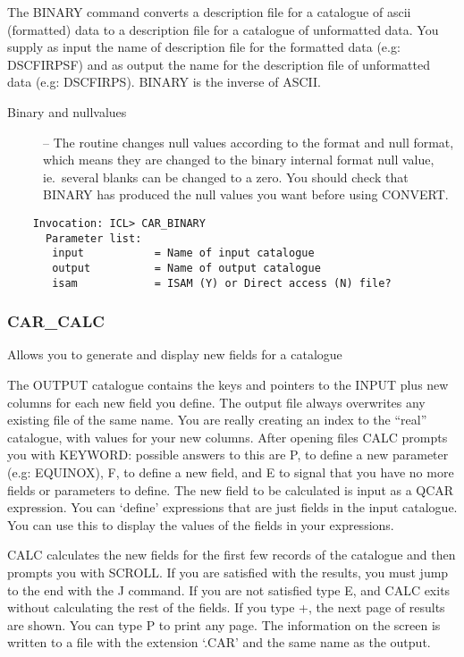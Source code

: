 The BINARY command converts a description file for a catalogue of ascii
(formatted) data to a description file for a catalogue of unformatted data. 
You supply as input the name of description file
for the formatted data (e.g: DSCFIRPSF) and as output the name for
the description file of unformatted data (e.g: DSCFIRPS).
BINARY is the inverse of ASCII.

\begin{description}
\item [Binary and nullvalues] --
The routine changes null values according to the format and null format,
which means they are changed to the binary internal format null value,
ie.\ several blanks can be changed to a zero.
You should check that BINARY has produced the null values you want before using
CONVERT.
\end{description}

\begin{verbatim}
    Invocation: ICL> CAR_BINARY
      Parameter list:
       input           = Name of input catalogue
       output          = Name of output catalogue
       isam            = ISAM (Y) or Direct access (N) file?
\end{verbatim}
 
\subsubsection{CAR\_CALC}

Allows you to generate and display new fields for a catalogue

The OUTPUT catalogue contains the keys and pointers to the INPUT
plus new columns for each new field you define. 
The output file always overwrites any existing file of the same name.
You are really creating an index to the ``real'' catalogue, with values for
your new columns.
After opening files CALC prompts you with KEYWORD:
possible answers to this are P, to define a new parameter (e.g: EQUINOX),
F, to define a new field, and E to signal that you have no more fields
or parameters to define.
The new field to be calculated is input as a QCAR expression.
You can `define' expressions that are just fields in the input catalogue.
You can use this to display the values of the fields in your expressions.

CALC calculates the new fields for the first few records
of the catalogue and then prompts you with SCROLL.  
If you are satisfied with the results, you must jump to the end with the J
command.  
If you are not satisfied type E, and CALC exits without calculating the 
rest of the fields.  
If you type +, the next page of results are shown.  
You can type P to print any page.
The information on the screen is written to a file with the extension `.CAR'
and the same name as the output.


